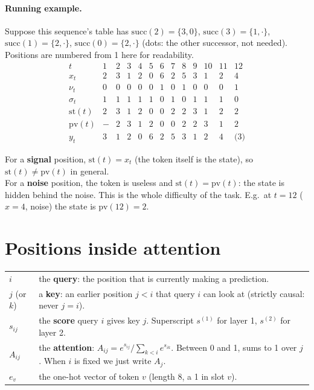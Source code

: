 \documentclass[11pt]{article}
\newcommand{\1}{\mathbf{1}}
\begin{document}
\paragraph{Running example.} Suppose this sequence's table has $\mathrm{succ}(2)=\{3,0\}$, $\mathrm{succ}(3)=\{1,\cdot\}$,
$\mathrm{succ}(1)=\{2,\cdot\}$, $\mathrm{succ}(0)=\{2,\cdot\}$ (dots: the other successor, not needed).
Positions are numbered from 1 here for readability.
\[
\begin{array}{l|cccccccccccc}
t & 1&2&3&4&5&6&7&8&9&10&11&12\\\hline
x_t & 2&3&1&2&0&6&2&5&3&1&2&4\\
\nu_t & 0&0&0&0&0&1&0&1&0&0&0&1\\
\sigma_t & 1&1&1&1&1&0&1&0&1&1&1&0\\
\mathrm{st}(t) & 2&3&1&2&0&0&2&2&3&1&2&2\\
\mathrm{pv}(t) & -&2&3&1&2&0&0&2&2&3&1&2\\
y_t & 3&1&2&0&6&2&5&3&1&2&4&\text{(3)}
\end{array}
\]
\begin{idea}
For a \textbf{signal} position, $\mathrm{st}(t)=x_t$ (the token itself is the state), so $\mathrm{st}(t)\ne\mathrm{pv}(t)$ in general.\\
For a \textbf{noise} position, the token is useless and $\mathrm{st}(t)=\mathrm{pv}(t)$: the state is hidden behind the noise.
This is the whole difficulty of the task. E.g.\ at $t=12$ ($x=4$, noise) the state is $\mathrm{pv}(12)=2$.
\end{idea}

\section{Positions inside attention}
\begin{center}
\begin{tabular}{>{\raggedright}p{2.6cm}p{11.8cm}}
\toprule
$i$ & the \textbf{query}: the position that is currently making a prediction.\\
$j$ (or $k$) & a \textbf{key}: an earlier position $j<i$ that query $i$ can look at (strictly causal: never $j=i$).\\
$s_{ij}$ & the \textbf{score} query $i$ gives key $j$. Superscript $s^{(1)}$ for layer 1, $s^{(2)}$ for layer 2.\\
$A_{ij}$ & the \textbf{attention}: $A_{ij}=e^{s_{ij}}/\sum_{k<i}e^{s_{ik}}$. Between 0 and 1, sums to 1 over $j$. When $i$ is fixed we just write $A_j$.\\
$e_v$ & the one-hot vector of token $v$ (length 8, a 1 in slot $v$).\\
\bottomrule
\end{tabular}
\end{center}
\end{document}
